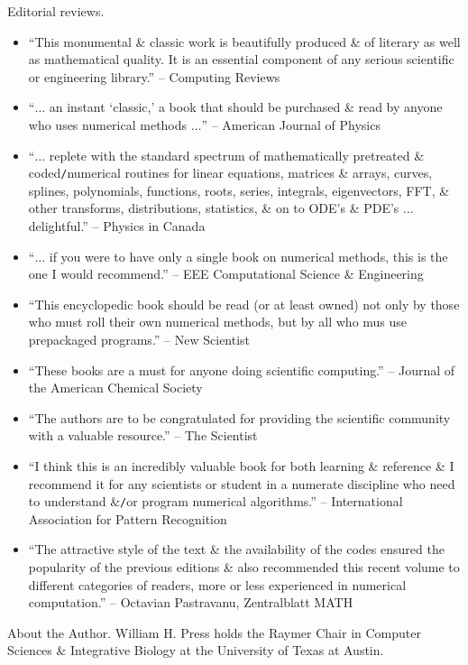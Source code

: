 \documentclass{article}
\begin{document}
\begin{enumerate}
	{\sf Editorial reviews.}
	\begin{itemize}
		\item ``This monumental \& classic work is beautifully produced \& of literary as well as mathematical quality. It is an essential component of any serious scientific or engineering library.'' -- Computing Reviews
		\item ``$\ldots$ an instant `classic,' a book that should be purchased \& read by anyone who uses numerical methods $\ldots$'' -- American Journal of Physics
		\item ``$\ldots$ replete with the standard spectrum of mathematically pretreated \& coded{\tt/}numerical routines for linear equations, matrices \& arrays, curves, splines, polynomials, functions, roots, series, integrals, eigenvectors, FFT, \& other transforms, distributions, statistics, \& on to ODE's \& PDE's $\ldots$ delightful.'' -- Physics in Canada
		\item ``$\ldots$ if you were to have only a single book on numerical methods, this is the one I would recommend.'' -- EEE Computational Science \& Engineering
		\item ``This encyclopedic book should be read (or at least owned) not only by those who must roll their own numerical methods, but by all who mus use prepackaged programs.'' -- New Scientist
		\item ``These books are a must for anyone doing scientific computing.'' -- Journal of the American Chemical Society
		\item ``The authors are to be congratulated for providing the scientific community with a valuable resource.'' -- The Scientist
		\item ``I think this is an incredibly valuable book for both learning \& reference \& I recommend it for any scientists or student in a numerate discipline who need to understand \&{\tt/}or program numerical algorithms.'' -- International Association for Pattern Recognition
		\item ``The attractive style of the text \& the availability of the codes ensured the popularity of the previous editions \& also recommended this recent volume to different categories of readers, more or less experienced in numerical computation.'' -- {\sc Octavian Pastravanu}, Zentralblatt MATH
	\end{itemize}
	{\sf About the Author.} {\sc William H. Press} holds the Raymer Chair in Computer Sciences \& Integrative Biology at the University of Texas at Austin.
	

\end{enumerate}
\end{document}
